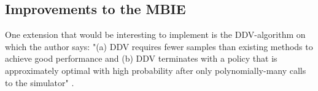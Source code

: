 \subsection{Improvements to the MBIE}
One extension that would be interesting to implement is the DDV-algorithm on which the author says: "(a) DDV requires fewer samples than existing methods to
achieve good performance and (b) DDV terminates with a
policy that is approximately optimal with high probability
after only polynomially-many calls to the simulator" \parencite{dietterich2013pac}.